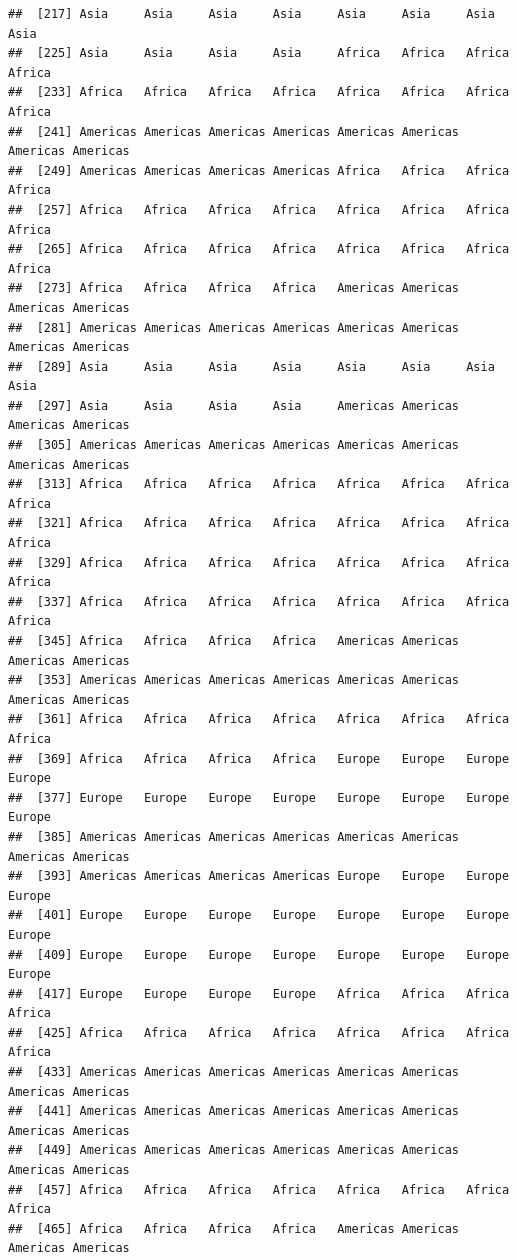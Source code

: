 \documentclass[
]{article}
\begin{document}
\begin{verbatim}
##  [217] Asia     Asia     Asia     Asia     Asia     Asia     Asia     Asia    
##  [225] Asia     Asia     Asia     Asia     Africa   Africa   Africa   Africa  
##  [233] Africa   Africa   Africa   Africa   Africa   Africa   Africa   Africa  
##  [241] Americas Americas Americas Americas Americas Americas Americas Americas
##  [249] Americas Americas Americas Americas Africa   Africa   Africa   Africa  
##  [257] Africa   Africa   Africa   Africa   Africa   Africa   Africa   Africa  
##  [265] Africa   Africa   Africa   Africa   Africa   Africa   Africa   Africa  
##  [273] Africa   Africa   Africa   Africa   Americas Americas Americas Americas
##  [281] Americas Americas Americas Americas Americas Americas Americas Americas
##  [289] Asia     Asia     Asia     Asia     Asia     Asia     Asia     Asia    
##  [297] Asia     Asia     Asia     Asia     Americas Americas Americas Americas
##  [305] Americas Americas Americas Americas Americas Americas Americas Americas
##  [313] Africa   Africa   Africa   Africa   Africa   Africa   Africa   Africa  
##  [321] Africa   Africa   Africa   Africa   Africa   Africa   Africa   Africa  
##  [329] Africa   Africa   Africa   Africa   Africa   Africa   Africa   Africa  
##  [337] Africa   Africa   Africa   Africa   Africa   Africa   Africa   Africa  
##  [345] Africa   Africa   Africa   Africa   Americas Americas Americas Americas
##  [353] Americas Americas Americas Americas Americas Americas Americas Americas
##  [361] Africa   Africa   Africa   Africa   Africa   Africa   Africa   Africa  
##  [369] Africa   Africa   Africa   Africa   Europe   Europe   Europe   Europe  
##  [377] Europe   Europe   Europe   Europe   Europe   Europe   Europe   Europe  
##  [385] Americas Americas Americas Americas Americas Americas Americas Americas
##  [393] Americas Americas Americas Americas Europe   Europe   Europe   Europe  
##  [401] Europe   Europe   Europe   Europe   Europe   Europe   Europe   Europe  
##  [409] Europe   Europe   Europe   Europe   Europe   Europe   Europe   Europe  
##  [417] Europe   Europe   Europe   Europe   Africa   Africa   Africa   Africa  
##  [425] Africa   Africa   Africa   Africa   Africa   Africa   Africa   Africa  
##  [433] Americas Americas Americas Americas Americas Americas Americas Americas
##  [441] Americas Americas Americas Americas Americas Americas Americas Americas
##  [449] Americas Americas Americas Americas Americas Americas Americas Americas
##  [457] Africa   Africa   Africa   Africa   Africa   Africa   Africa   Africa  
##  [465] Africa   Africa   Africa   Africa   Americas Americas Americas Americas

\end{verbatim}
\end{document}
